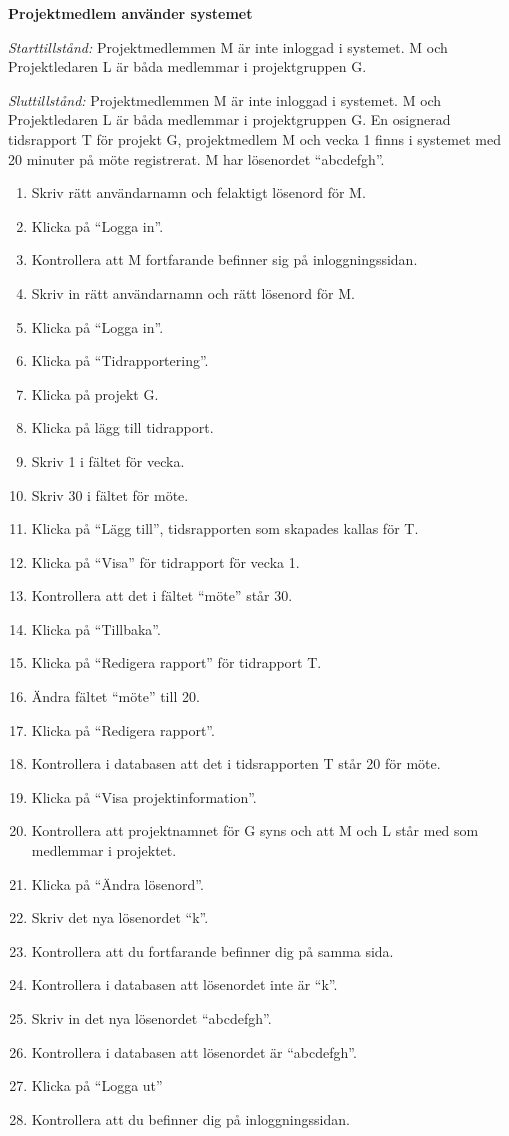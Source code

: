 \documentclass[a4paper]{article}
\begin{document}
\begin{ST}
\item \textbf{Projektmedlem använder systemet}

\emph{Starttillstånd:} Projektmedlemmen M är inte inloggad i systemet. M och Projektledaren L är båda medlemmar i projektgruppen G.

\emph{Sluttillstånd:} Projektmedlemmen M är inte inloggad i systemet. M och Projektledaren L är båda medlemmar i projektgruppen G. En osignerad tidsrapport T för projekt G, projektmedlem M och vecka 1 finns i systemet med 20 minuter på möte registrerat. M har lösenordet ``abcdefgh''.

\begin{enumerate}
\item Skriv rätt användarnamn och felaktigt lösenord för M.
\item Klicka på ``Logga in''.
\item Kontrollera att M fortfarande befinner sig på inloggningssidan.
\item Skriv in rätt användarnamn och rätt lösenord för M.
\item Klicka på ``Logga in''.
\item Klicka på ``Tidrapportering''.
\item Klicka på projekt G.
\item Klicka på lägg till tidrapport.
\item Skriv 1 i fältet för vecka.
\item Skriv 30 i fältet för möte.
\item Klicka på ``Lägg till'', tidsrapporten som skapades kallas för T.
\item Klicka på ``Visa'' för tidrapport för vecka 1.
\item Kontrollera att det i fältet ``möte'' står 30.
\item Klicka på ``Tillbaka''.
\item Klicka på ``Redigera rapport'' för tidrapport T.
\item Ändra fältet ``möte'' till 20.
\item Klicka på ``Redigera rapport''.
\item Kontrollera i databasen att det i tidsrapporten T står 20 för möte.
\item Klicka på ``Visa projektinformation''.
\item Kontrollera att projektnamnet för G syns och att M och L står med som medlemmar i projektet.
\item Klicka på ``Ändra lösenord''.
\item Skriv det nya lösenordet ``k''.
\item Kontrollera att du fortfarande befinner dig på samma sida.
\item Kontrollera i databasen att lösenordet inte är ``k''.
\item Skriv in det nya lösenordet ``abcdefgh''.
\item Kontrollera i databasen att lösenordet är ``abcdefgh''.
\item Klicka på ``Logga ut''
\item Kontrollera att du befinner dig på inloggningssidan.


\end{enumerate}
\end{ST}
\end{document}
